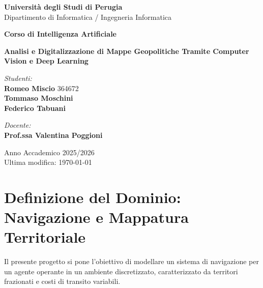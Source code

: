 \documentclass[12pt,a4paper]{article}
\begin{document}
	\begin{titlepage}
		\centering
		\vspace*{1cm}
		{\Huge \textbf{Università degli Studi di Perugia}} \\
		\vspace{0.5cm}
		{\Large Dipartimento di Informatica / Ingegneria Informatica} \\

		\vspace{2cm}

		{\Large \textbf{Corso di Intelligenza Artificiale}} \\
		\vspace{1.5cm}

		{\huge \textbf{Analisi e Digitalizzazione di Mappe Geopolitiche Tramite Computer Vision e Deep Learning}} \\
		\vspace{3cm}

		\begin{minipage}[t]{0.45\textwidth}
			\begin{flushleft} \large
				\emph{Studenti:}\\
				\textbf{Romeo Miscio} 364672\\
				\textbf{Tommaso Moschini}\\
				\textbf{Federico Tabuani}
			\end{flushleft}
		\end{minipage}
		\hfill
		\begin{minipage}[t]{0.45\textwidth}
			\begin{flushright} \large
				\emph{Docente:} \\
				\textbf{Prof.ssa Valentina Poggioni}
			\end{flushright}
		\end{minipage}

		\vfill
		{\large Anno Accademico 2025/2026} \\
		\vspace{0.5cm}
		{\large Ultima modifica: \today}
	\end{titlepage}

	\newpage
	\tableofcontents
	\newpage

	\section{Definizione del Dominio: Navigazione e Mappatura Territoriale}
	Il presente progetto si pone l'obiettivo di modellare un sistema di navigazione per un agente operante in un ambiente discretizzato, caratterizzato da territori frazionati e costi di transito variabili.
\end{document}
